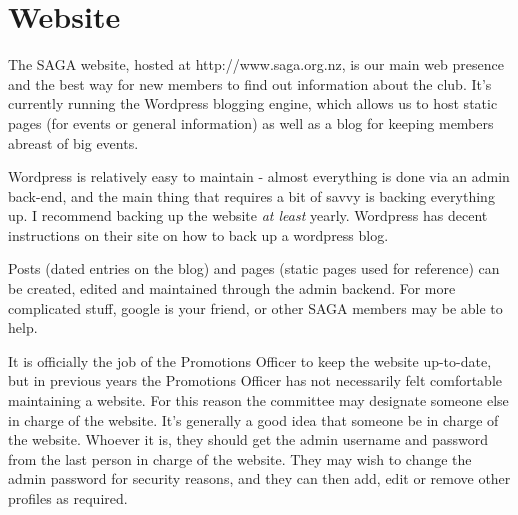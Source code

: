 \section{Website}

The SAGA website, hosted at http://www.saga.org.nz, is our main web presence and the best way for new members to find out information about the club. It's currently running the Wordpress blogging engine, which allows us to host static pages (\eg for events or general information) as well as a blog for keeping members abreast of big events.

Wordpress is relatively easy to maintain - almost everything is done via an admin back-end, and the main thing that requires a bit of savvy is backing everything up. I recommend backing up the website \textit{at least} yearly. Wordpress has decent instructions on their site on how to back up a wordpress blog.

Posts (\ie dated entries on the blog) and pages (\ie static pages used for reference) can be created, edited and maintained through the admin backend. For more complicated stuff, google is your friend, or other SAGA members may be able to help.

It is officially the job of the Promotions Officer to keep the website up-to-date, but in previous years the Promotions Officer has not necessarily felt comfortable maintaining a website. For this reason the committee may designate someone else in charge of the website. It's generally a good idea that someone be in charge of the website. Whoever it is, they should get the admin username and password from the last person in charge of the website. They may wish to change the admin password for security reasons, and they can then add, edit or remove other profiles as required.